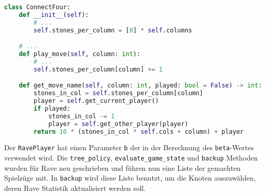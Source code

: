 \begin{lstlisting}[language=Python,label={lst:move-name}]
class ConnectFour:
    def __init__(self):
        # ...
        self.stones_per_column = [0] * self.columns

    # ...
    def play_move(self, column: int):
        # ...
        self.stones_per_column[column] += 1

    def get_move_name(self, column: int, played: bool = False) -> int:
        stones_in_col = self.stones_per_column[column]
        player = self.get_current_player()
        if played:
            stones_in_col -= 1
            player = self.get_other_player(player)
        return 10 * (stones_in_col * self.cols + column) + player
\end{lstlisting}

Der \verb|RavePlayer| hat einen Parameter \verb|b| der in der Berechnung des \verb|beta|-Wertes verwendet wird.
Die \verb|tree_policy|, \verb|evaluate_game_state| und \verb|backup| Methoden wurden für Rave neu geschrieben und führen nun eine Liste der gemachten Spielzüge mit.
In \verb|backup| wird diese Liste benutzt, um die Knoten auszuwählen, deren Rave Statistik aktualisiert werden soll.


